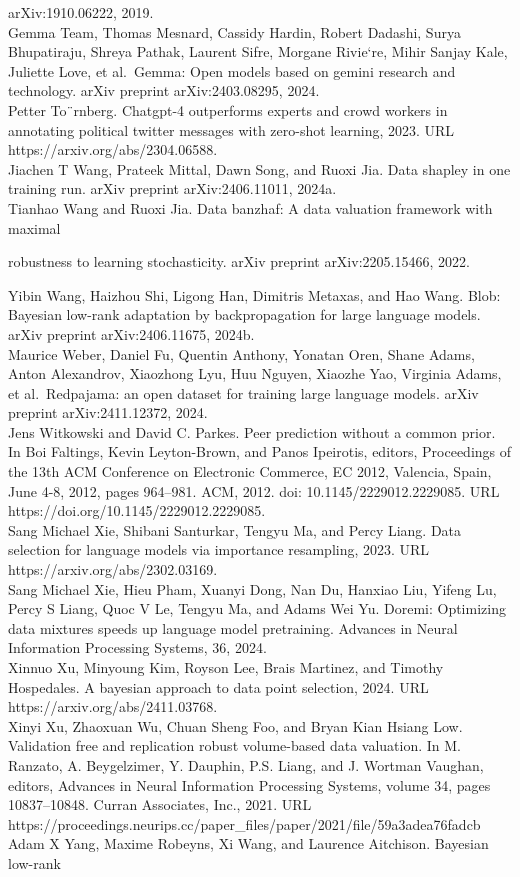 arXiv:1910.06222, 2019.\\
Gemma Team, Thomas Mesnard, Cassidy Hardin, Robert Dadashi, Surya
Bhupatiraju, Shreya Pathak, Laurent Sifre, Morgane Rivie`re, Mihir
Sanjay Kale, Juliette Love, et al.~Gemma: Open models based on gemini
research and technology. arXiv preprint arXiv:2403.08295, 2024.\\
Petter To¨rnberg. Chatgpt-4 outperforms experts and crowd workers in
annotating political twitter messages with zero-shot learning, 2023. URL
https://arxiv.org/abs/2304.06588.\\
Jiachen T Wang, Prateek Mittal, Dawn Song, and Ruoxi Jia. Data shapley
in one training run. arXiv preprint arXiv:2406.11011, 2024a.\\
Tianhao Wang and Ruoxi Jia. Data banzhaf: A data valuation framework
with maximal

robustness to learning stochasticity. arXiv preprint arXiv:2205.15466,
2022.

Yibin Wang, Haizhou Shi, Ligong Han, Dimitris Metaxas, and Hao Wang.
Blob: Bayesian low-rank adaptation by backpropagation for large language
models. arXiv preprint arXiv:2406.11675, 2024b.\\
Maurice Weber, Daniel Fu, Quentin Anthony, Yonatan Oren, Shane Adams,
Anton Alexandrov, Xiaozhong Lyu, Huu Nguyen, Xiaozhe Yao, Virginia
Adams, et al.~Redpajama: an open dataset for training large language
models. arXiv preprint arXiv:2411.12372, 2024.\\
Jens Witkowski and David C. Parkes. Peer prediction without a common
prior. In Boi Faltings, Kevin Leyton-Brown, and Panos Ipeirotis,
editors, Proceedings of the 13th ACM Conference on Electronic Commerce,
EC 2012, Valencia, Spain, June 4-8, 2012, pages 964--981. ACM, 2012.
doi: 10.1145/2229012.2229085. URL
https://doi.org/10.1145/2229012.2229085.\\
Sang Michael Xie, Shibani Santurkar, Tengyu Ma, and Percy Liang. Data
selection for language models via importance resampling, 2023. URL
https://arxiv.org/abs/2302.03169.\\
Sang Michael Xie, Hieu Pham, Xuanyi Dong, Nan Du, Hanxiao Liu, Yifeng
Lu, Percy S Liang, Quoc V Le, Tengyu Ma, and Adams Wei Yu. Doremi:
Optimizing data mixtures speeds up language model pretraining. Advances
in Neural Information Processing Systems, 36, 2024.\\
Xinnuo Xu, Minyoung Kim, Royson Lee, Brais Martinez, and Timothy
Hospedales. A bayesian approach to data point selection, 2024. URL
https://arxiv.org/abs/2411.03768.\\
Xinyi Xu, Zhaoxuan Wu, Chuan Sheng Foo, and Bryan Kian Hsiang Low.
Validation free and replication robust volume-based data valuation. In
M. Ranzato, A. Beygelzimer, Y. Dauphin, P.S. Liang, and J. Wortman
Vaughan, editors, Advances in Neural Information Processing Systems,
volume 34, pages 10837--10848. Curran Associates, Inc., 2021. URL
https://proceedings.neurips.cc/paper\_files/paper/2021/file/59a3adea76fadcb\\
Adam X Yang, Maxime Robeyns, Xi Wang, and Laurence Aitchison. Bayesian
low-rank

